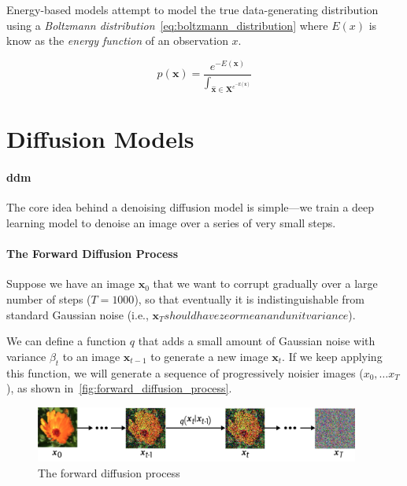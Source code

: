 Energy-based models attempt to model the true data-generating distribution using a \emph{Boltzmann distribution}~\eqref{eq:boltzmann_distribution} where \( E\left( x\right)\) is know as the \emph{energy function} of an observation \( x\).

\begin{equation}
	p\left(\mathbf{x}\right) = \frac{e^{-E(\mathbf{x})} }{\int_{\mathbf{\hat{x}} \in \mathbf{X}^{e^{-E(\mathbf{\hat{x}})}}}}
	\label{eq:boltzmann_distribution}
\end{equation}

\section{Diffusion Models}

\paragraph{\gls{ddm}}

The core idea behind a denoising diffusion model is simple—we train a deep learning model to denoise an image over a series of very small steps.


\paragraph{The Forward Diffusion Process}

Suppose we have an image \( \mathbf{x}_{0} \) that we want to corrupt gradually over a large number of steps (\( T= 1000\)), so that eventually it is indistinguishable from standard Gaussian noise (i.e., \( \mathbf{x}_{T} should have zeor mean and unit variance\)).


We can define a function \( q \) that adds a small amount of Gaussian noise with variance \( \beta_{t} \) to an image \( \mathbf{x}_{t-1} \) to generate a new image \( \mathbf{x}_t \).
If we keep applying this function, we will generate a sequence of progressively noisier images (\( x_{0}, \ldots x_{T} \)), as shown in~\autoref{fig:forward_diffusion_process}.

\begin{figure}
	\begin{center}
		\includegraphics[width=0.95\textwidth]{figures/forward_diffusion_process}
	\end{center}
	\caption{The forward diffusion process}\label{fig:forward_diffusion_process}
\end{figure}


